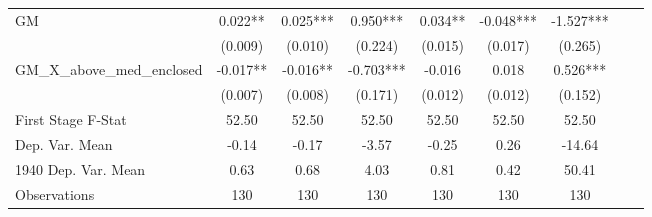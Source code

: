 \begin{tabular}{l*{8}{c}}
\cmidrule(lr){1-7}
GM              &    0.022** &    0.025***&    0.950***&    0.034** &   -0.048***&   -1.527***\\
                &  (0.009)   &  (0.010)   &  (0.224)   &  (0.015)   &  (0.017)   &  (0.265)   \\
\addlinespace
GM\_X\_above\_med\_enclosed&   -0.017** &   -0.016** &   -0.703***&   -0.016   &    0.018   &    0.526***\\
                &  (0.007)   &  (0.008)   &  (0.171)   &  (0.012)   &  (0.012)   &  (0.152)   \\
\midrule
First Stage F-Stat&    52.50   &    52.50   &    52.50   &    52.50   &    52.50   &    52.50   \\
Dep. Var. Mean  &    -0.14   &    -0.17   &    -3.57   &    -0.25   &     0.26   &   -14.64   \\
1940 Dep. Var. Mean&     0.63   &     0.68   &     4.03   &     0.81   &     0.42   &    50.41   \\
Observations    &      130   &      130   &      130   &      130   &      130   &      130   \\
       \bottomrule \end{tabular}

